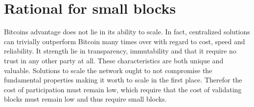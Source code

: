 \section{Rational for small blocks}

Bitcoins advantage does not lie in its ability to scale. In fact, centralized solutions can trivially outperform Bitcoin many times over with regard to cost, speed and reliability. It strength lie in transparency, immutability and that it require no trust in any other party at all. These characteristics are both unique and valuable. Solutions to scale the network ought to not compromise the fundamental properties making it worth to scale in the first place. Therefor the cost of participation must remain low, which require that the cost of validating blocks must remain low and thus require small blocks.

